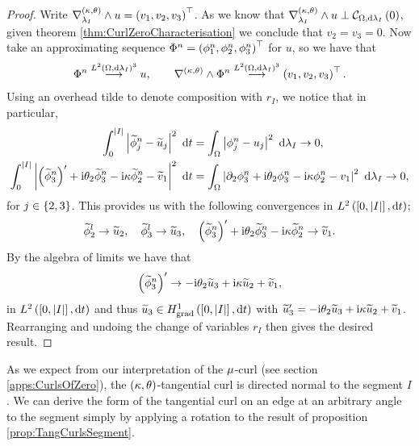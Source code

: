 \begin{proof}
	Write $\nabla_{\lambda_I}^{\left( \kappa, \theta \right)}\wedge u = \left( v_1, v_2, v_3 \right)^\top$.
	As we know that $\nabla_{\lambda_I}^{\left( \kappa, \theta \right)}\wedge u \perp \mathcal{C}_{ \Omega, \mathrm{d}\lambda_I}\left( 0 \right)$, given theorem \ref{thm:CurlZeroCharacterisation} we conclude that $v_2 = v_3 = 0$.
	Now take an approximating sequence $\Phi^n = \left( \phi^n_1, \phi^n_2, \phi^n_3 \right)^\top$ for $u$, so we have that
	\begin{align*}
		\Phi^n \overset{ L^{2}\left( \Omega,\mathrm{d}\lambda_I \right)^3 }{\longrightarrow} u, \qquad \nabla_{}^{\left( \kappa, \theta \right)}\wedge\Phi^n \overset{ L^{2}\left( \Omega,\mathrm{d}\lambda_I \right)^3 }{\longrightarrow} \left( v_1, v_2, v_3 \right)^\top.
	\end{align*}
	Using an overhead tilde to denote composition with $r_I$, we notice that in particular,
	\begin{align*}
		\int_0^{\left\lvert I \right\rvert} \left\lvert \widetilde{\phi}^n_j - \widetilde{u}_j \right\rvert^2 \ \mathrm{d} t
		&= \int_{\Omega} \left\lvert \phi^n_j - u_j \right\rvert^2  \ \mathrm{d}\lambda_I 
		\rightarrow 0, \\
		\int_0^{\left\lvert I \right\rvert} \left\lvert  \left( \widetilde{\phi}^n_3 \right)' + \mathrm{i}\theta_2\widetilde{\phi}^n_3 - \mathrm{i}\kappa\widetilde{\phi}^n_2 - \widetilde{v}_1  \right\rvert^2 \ \mathrm{d} t
		&= \int_{\Omega} \left\lvert  \partial_2\phi^n_3 + \mathrm{i}\theta_2\phi^n_3 - \mathrm{i}\kappa\phi^n_2 - v_1  \right\rvert^2  \ \mathrm{d}\lambda_I
		\rightarrow 0,
	\end{align*}
	for $j\in\left\{ 2,3 \right\}$.
	This provides us with the following convergences in $L^{2}\left( \left[ 0,\left\lvert I \right\rvert \right],\mathrm{d}t \right)$;
	\begin{align*}
		\widetilde{\phi}^l_2 \rightarrow \widetilde{u}_2, \quad
		\widetilde{\phi}^l_3 \rightarrow \widetilde{u}_3, \quad
		\left( \widetilde{\phi}^n_3 \right)' + \mathrm{i}\theta_2\widetilde{\phi}^n_3 - \mathrm{i}\kappa\widetilde{\phi}^n_2 \rightarrow \widetilde{v}_1.
	\end{align*}
	By the algebra of limits we have that
	\begin{align*}
		\left( \widetilde{\phi}^n_3 \right)' \rightarrow -\mathrm{i}\theta_2\widetilde{u}_3 + \mathrm{i}\kappa\widetilde{u}_2 + \widetilde{v}_1,
	\end{align*}
	in $L^{2}\left( \left[ 0,\left\lvert I \right\rvert \right],\mathrm{d}t \right)$ and thus $\widetilde{u}_3\in H^1_\mathrm{grad}\left( \left[ 0,\left\lvert I \right\rvert \right], \mathrm{d}t \right)$ with $\widetilde{u}_3' = -\mathrm{i}\theta_2\widetilde{u}_3 + \mathrm{i}\kappa\widetilde{u}_2 + \widetilde{v}_1$.
	Rearranging and undoing the change of variables $r_I$ then gives the desired result.
\end{proof}

As we expect from our interpretation of the $\mu$-curl (see section \ref{apps:CurlsOfZero}), the $\left( \kappa, \theta \right)$-tangential curl is directed normal to the segment $I$.
We can derive the form of the tangential curl on an edge at an arbitrary angle to the segment simply by applying a rotation to the result of proposition \ref{prop:TangCurlsSegment}.
\begin{cory} \label{cory:TangCurlRotated}
\end{cory}

